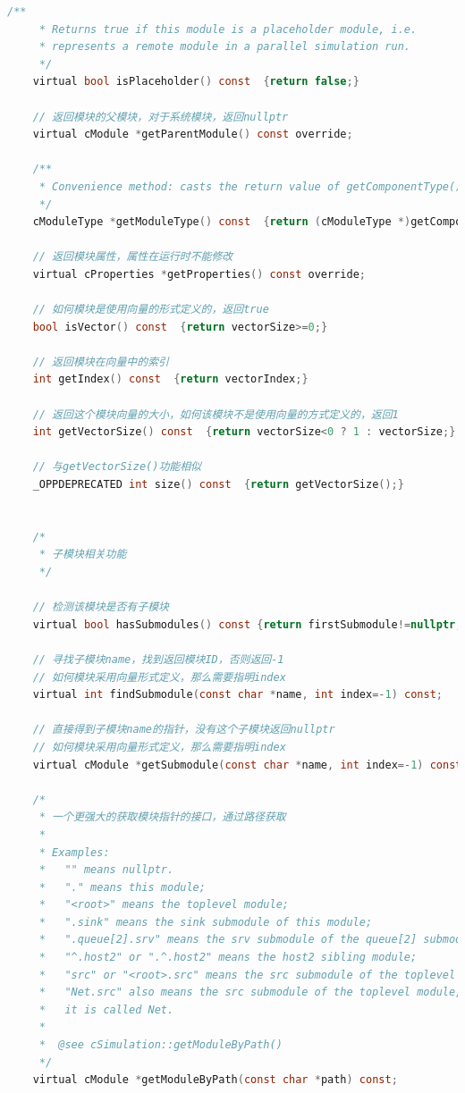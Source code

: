 \begin{lstlisting}[language=c]
    /**
     * Returns true if this module is a placeholder module, i.e.
     * represents a remote module in a parallel simulation run.
     */
    virtual bool isPlaceholder() const  {return false;}

    // 返回模块的父模块，对于系统模块，返回nullptr
    virtual cModule *getParentModule() const override;

    /**
     * Convenience method: casts the return value of getComponentType() to cModuleType.
     */
    cModuleType *getModuleType() const  {return (cModuleType *)getComponentType();}

    // 返回模块属性，属性在运行时不能修改
    virtual cProperties *getProperties() const override;

    // 如何模块是使用向量的形式定义的，返回true
    bool isVector() const  {return vectorSize>=0;}

    // 返回模块在向量中的索引
    int getIndex() const  {return vectorIndex;}

    // 返回这个模块向量的大小，如何该模块不是使用向量的方式定义的，返回1
    int getVectorSize() const  {return vectorSize<0 ? 1 : vectorSize;}

    // 与getVectorSize()功能相似
    _OPPDEPRECATED int size() const  {return getVectorSize();}


    /*
     * 子模块相关功能
     */

    // 检测该模块是否有子模块
    virtual bool hasSubmodules() const {return firstSubmodule!=nullptr;}

    // 寻找子模块name，找到返回模块ID，否则返回-1
    // 如何模块采用向量形式定义，那么需要指明index
    virtual int findSubmodule(const char *name, int index=-1) const;

    // 直接得到子模块name的指针，没有这个子模块返回nullptr
    // 如何模块采用向量形式定义，那么需要指明index
    virtual cModule *getSubmodule(const char *name, int index=-1) const;

    /*
     * 一个更强大的获取模块指针的接口，通过路径获取
     *
     * Examples:
     *   "" means nullptr.
     *   "." means this module;
     *   "<root>" means the toplevel module;
     *   ".sink" means the sink submodule of this module;
     *   ".queue[2].srv" means the srv submodule of the queue[2] submodule;
     *   "^.host2" or ".^.host2" means the host2 sibling module;
     *   "src" or "<root>.src" means the src submodule of the toplevel module;
     *   "Net.src" also means the src submodule of the toplevel module, provided
     *   it is called Net.
     *
     *  @see cSimulation::getModuleByPath()
     */
    virtual cModule *getModuleByPath(const char *path) const;


\end{lstlisting}
